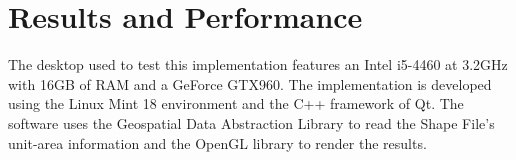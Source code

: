 
\section{Results and Performance} \label{performance}
The desktop used to test this implementation features an Intel i5-4460 at 3.2GHz with 16GB of RAM and a GeForce GTX960. The implementation is developed using the Linux Mint 18 environment and the C++ framework of Qt. The software uses the Geospatial Data Abstraction Library to read the Shape File's unit-area information \cite{GDAL} and the OpenGL library to render the results.


